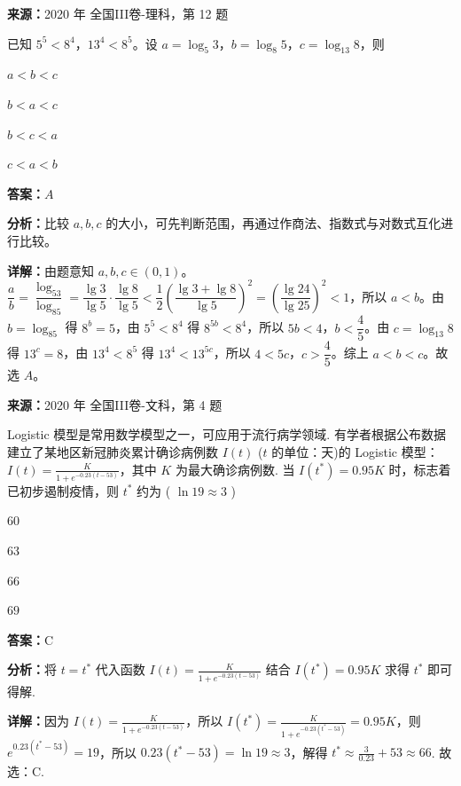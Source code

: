 \begin{question}[points=5]
\textbf{来源：}2020 年 全国III卷-理科，第 12 题\par
已知 $5^5<8^4$，$13^4<8^5$。设 $a=\log_5 3$，$b=\log_8 5$，$c=\log_{13}8$，则
\begin{choices}
  \item $a<b<c$
  \item $b<a<c$
  \item $b<c<a$
  \item $c<a<b$
\end{choices}
\begin{solution}
\textbf{答案：}$A$

\textbf{分析：}比较 $a,b,c$ 的大小，可先判断范围，再通过作商法、指数式与对数式互化进行比较。

\textbf{详解：}由题意知 $a,b,c\in(0,1)$。$\dfrac{a}{b}=\dfrac{\log_53}{\log_85}=\dfrac{\lg3}{\lg5}\cdot\dfrac{\lg8}{\lg5}<\dfrac{1}{2}\left(\dfrac{\lg3+\lg8}{\lg5}\right)^2=\left(\dfrac{\lg24}{\lg25}\right)^2<1$，所以 $a<b$。由 $b=\log_85$ 得 $8^b=5$，由 $5^5<8^4$ 得 $8^{5b}<8^4$，所以 $5b<4$，$b<\dfrac45$。由 $c=\log_{13}8$ 得 $13^c=8$，由 $13^4<8^5$ 得 $13^4<13^{5c}$，所以 $4<5c$，$c>\dfrac45$。综上 $a<b<c$。故选 $A$。
\end{solution}
\end{question}

\begin{question}[points=5]
\textbf{来源：}2020 年 全国III卷-文科，第 4 题\par
Logistic 模型是常用数学模型之一，可应用于流行病学领域. 有学者根据公布数据建立了某地区新冠肺炎累计确诊病例数 $I(t)$ ($t$ 的单位：天)的 Logistic 模型：$I(t)=\frac{K}{1+e^{-0.23(t-53)}}$，其中 $K$ 为最大确诊病例数. 当 $I(t^*)=0.95K$ 时，标志着已初步遏制疫情，则 $t^*$ 约为 ( $\ln19\approx3$ )
\begin{choices}
  \item $60$
  \item $63$
  \item $66$
  \item $69$
\end{choices}
\begin{solution}
\textbf{答案：}C

\textbf{分析：}将 $t=t^*$ 代入函数 $I(t)=\frac{K}{1+e^{-0.23(t-53)}}$ 结合 $I(t^*)=0.95K$ 求得 $t^*$ 即可得解.

\textbf{详解：}因为 $I(t)=\frac{K}{1+e^{-0.23(t-53)}}$，所以 $I(t^*)=\frac{K}{1+e^{-0.23(t^*-53)}}=0.95K$，则 $e^{0.23(t^*-53)}=19$，所以 $0.23(t^*-53)=\ln19\approx3$，解得 $t^*\approx\frac{3}{0.23}+53\approx66$. 故选：C.
\end{solution}
\end{question}

